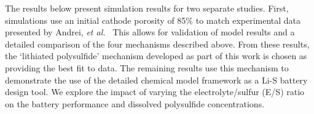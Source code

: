 \documentclass{elsarticle}
\begin{document}
The results below present simulation results for two separate studies.  First, simulations use an initial cathode porosity of 85\% to match experimental data presented by Andrei,\textit{ et al.}~\cite{ANDREI2018469} This allows for validation of model results and a detailed comparison of the four mechanisms described above.  From these results, the `lithiated polysulfide' mechanism developed as part of this work is chosen as providing the best fit to data. The remaining results use this mechanism to demonstrate the use of the detailed chemical model framework as a Li-S battery design tool. We explore the impact of varying the electrolyte/sulfur (E/S) ratio on the battery performance and dissolved polysulfide concentrations. 
\end{document}
